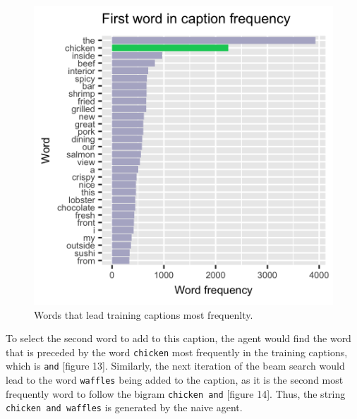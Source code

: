 \documentclass[letterpaper, 10 pt, conference]{ieeeconf}
\begin{document}
\begin{figure}[H]
\centering
\includegraphics[width=.8\linewidth]{first}
\caption{Words that lead training captions most frequenlty.}
\label{fig:test1}
\end{figure}

To select the second word to add to this caption, the agent would find the word that is preceded by the word \texttt{chicken} most frequently in the training captions, which is \texttt{and} [figure 13]. Similarly, the next iteration of the beam search would lead to the word \texttt{waffles} being added to the caption, as it is the second most frequently word to follow the bigram \texttt{chicken and} [figure 14]. Thus, the string \texttt{chicken and waffles} is generated by the naive agent. 
\end{document}
